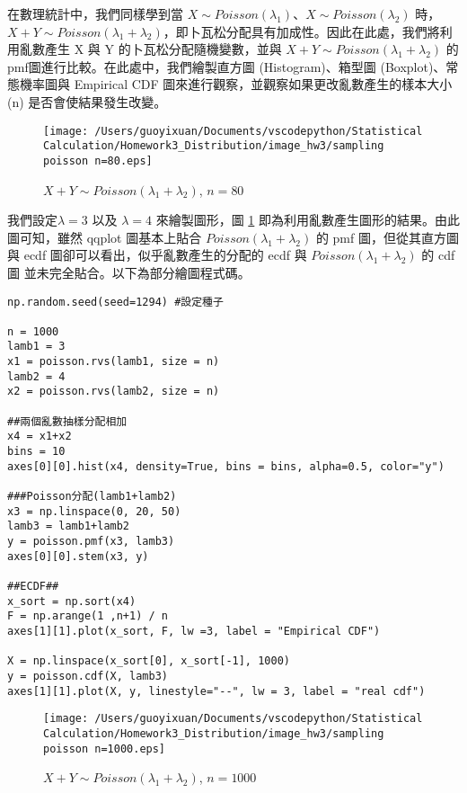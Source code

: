 在數理統計中，我們同樣學到當 $X \sim Poisson(\lambda_{1})$、$X \sim Poisson(\lambda_{2})$ 時，$X+Y \sim Poisson(\lambda_{1}+\lambda_{2})$，即卜瓦松分配具有加成性。因此在此處，我們將利用亂數產生 X 與 Y 的卜瓦松分配隨機變數，並與 $X+Y \sim Poisson(\lambda_{1}+\lambda_{2})$ 的 pmf圖進行比較。在此處中，我們繪製直方圖 (Histogram)、箱型圖 (Boxplot)、常態機率圖與 Empirical CDF 圖來進行觀察，並觀察如果更改亂數產生的樣本大小 (n) 是否會使結果發生改變。

\begin{figure}[H]
    \centering
        \texttt{[image: /Users/guoyixuan/Documents/vscodepython/Statistical Calculation/Homework3\_Distribution/image\_hw3/sampling poisson n=80.eps]}
    \caption{$X+Y \sim Poisson(\lambda_{1}+\lambda_{2})$, $n=80$}
    \label{fig:Poisson Addiction when n = 80}
\end{figure}

我們設定$\lambda=3$ 以及 $\lambda=4$ 來繪製圖形，圖 \ref{fig:Poisson Addiction when n = 80} 即為利用亂數產生圖形的結果。由此圖可知，雖然 qqplot 圖基本上貼合 $Poisson(\lambda_{1}+\lambda_{2})$ 的 pmf 圖，但從其直方圖與 ecdf 圖卻可以看出，似乎亂數產生的分配的 ecdf 與 $Poisson(\lambda_{1}+\lambda_{2})$ 的 cdf 圖 並未完全貼合。以下為部分繪圖程式碼。

\bigskip
\begin{lstlisting}
np.random.seed(seed=1294) #設定種子

n = 1000
lamb1 = 3
x1 = poisson.rvs(lamb1, size = n)
lamb2 = 4
x2 = poisson.rvs(lamb2, size = n)

##兩個亂數抽樣分配相加
x4 = x1+x2
bins = 10
axes[0][0].hist(x4, density=True, bins = bins, alpha=0.5, color="y")

###Poisson分配(lamb1+lamb2)
x3 = np.linspace(0, 20, 50)
lamb3 = lamb1+lamb2
y = poisson.pmf(x3, lamb3)
axes[0][0].stem(x3, y)

##ECDF##
x_sort = np.sort(x4)
F = np.arange(1 ,n+1) / n 
axes[1][1].plot(x_sort, F, lw =3, label = "Empirical CDF")

X = np.linspace(x_sort[0], x_sort[-1], 1000)
y = poisson.cdf(X, lamb3)
axes[1][1].plot(X, y, linestyle="--", lw = 3, label = "real cdf")
\end{lstlisting}

\begin{figure}[H]
    \centering
        \texttt{[image: /Users/guoyixuan/Documents/vscodepython/Statistical Calculation/Homework3\_Distribution/image\_hw3/sampling poisson n=1000.eps]}
    \caption{$X+Y \sim Poisson(\lambda_{1}+\lambda_{2})$, $n=1000$}
    \label{fig:Poisson Addiction when n = 1000}
\end{figure}

